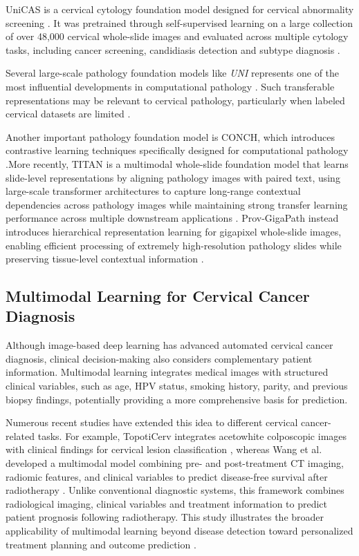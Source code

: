 \documentclass{article}
\begin{document}
UniCAS is a cervical cytology foundation model designed for cervical abnormality screening \cite{jiang2026unicas}. It was pretrained through self-supervised learning on a large collection of over 48,000 cervical whole-slide images and evaluated across multiple cytology tasks, including cancer screening, candidiasis detection and subtype diagnosis \cite{jiang2026unicas}.

Several large-scale pathology foundation models like \textit{UNI} represents one of the most influential developments in computational pathology \cite{chen2024uni}. Such transferable representations may be relevant to cervical pathology, particularly when labeled cervical datasets are limited \cite{chen2024uni}.

Another important pathology foundation model is CONCH, which introduces contrastive learning techniques specifically designed for computational pathology \cite{lu2024visual}.More recently, TITAN is a multimodal whole-slide foundation model that learns slide-level representations by aligning pathology images with paired text, using large-scale transformer architectures to capture long-range contextual dependencies across pathology images while maintaining strong transfer learning performance across multiple downstream applications \cite{ding2025titan}. Prov-GigaPath instead introduces hierarchical representation learning for gigapixel whole-slide images, enabling efficient processing of extremely high-resolution pathology slides while preserving tissue-level contextual information \cite{xu2024provgigapath}. 

\subsection{Multimodal Learning for Cervical Cancer Diagnosis}

Although image-based deep learning has advanced automated cervical cancer diagnosis, clinical decision-making also considers complementary patient information. Multimodal learning integrates medical images with structured clinical variables, such as age, HPV status, smoking history, parity, and previous biopsy findings, potentially providing a more comprehensive basis for prediction.

Numerous recent studies have extended this idea to different cervical cancer-related tasks. For example, TopotiCerv integrates acetowhite colposcopic images with clinical findings for cervical lesion classification \cite{das2026topoticerv}, whereas Wang et al. developed a multimodal model combining pre- and post-treatment CT imaging, radiomic features, and clinical variables to predict disease-free survival after radiotherapy \cite{wang2025cervipro}. Unlike conventional diagnostic systems, this framework combines radiological imaging, clinical variables and treatment information to predict patient prognosis following radiotherapy. This study illustrates the broader applicability of multimodal learning beyond disease detection toward personalized treatment planning and outcome prediction \cite{wang2025cervipro}.
\end{document}
